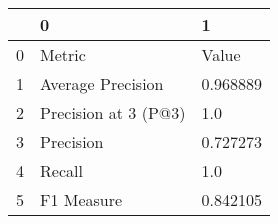 \begin{tabular}{lll}
\toprule
{} &                     0 &         1 \\
\midrule
0 &                Metric &     Value \\
1 &     Average Precision &  0.968889 \\
2 &  Precision at 3 (P@3) &       1.0 \\
3 &             Precision &  0.727273 \\
4 &                Recall &       1.0 \\
5 &            F1 Measure &  0.842105 \\
\bottomrule
\end{tabular}
